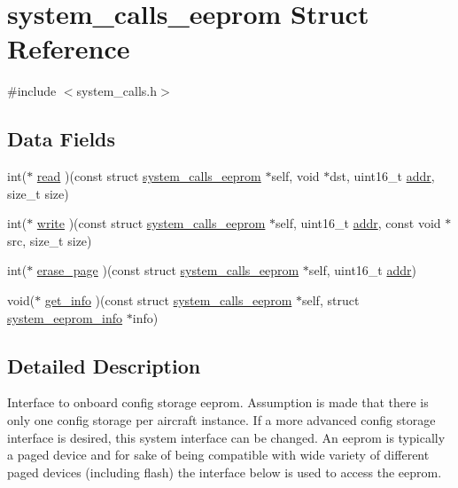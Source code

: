 \hypertarget{structsystem__calls__eeprom}{\section{system\+\_\+calls\+\_\+eeprom Struct Reference}
\label{structsystem__calls__eeprom}
}


{\ttfamily \#include $<$system\+\_\+calls.\+h$>$}

\subsection*{Data Fields}
\begin{DoxyCompactItemize}
\item 
int($\ast$ \hyperlink{structsystem__calls__eeprom_a50c4197d24c30fa3781ec7ec1636c8c6}{read} )(const struct \hyperlink{structsystem__calls__eeprom}{system\+\_\+calls\+\_\+eeprom} $\ast$self, void $\ast$dst, uint16\+\_\+t \hyperlink{config_8c_a41a6aad09727eb120338c35535a652a6}{addr}, size\+\_\+t size)
\item 
int($\ast$ \hyperlink{structsystem__calls__eeprom_a927d9e44a9dd2dcf2d9aa5623954ef07}{write} )(const struct \hyperlink{structsystem__calls__eeprom}{system\+\_\+calls\+\_\+eeprom} $\ast$self, uint16\+\_\+t \hyperlink{config_8c_a41a6aad09727eb120338c35535a652a6}{addr}, const void $\ast$src, size\+\_\+t size)
\item 
int($\ast$ \hyperlink{structsystem__calls__eeprom_acb465a4f40b9f5db82b1afd12a76540f}{erase\+\_\+page} )(const struct \hyperlink{structsystem__calls__eeprom}{system\+\_\+calls\+\_\+eeprom} $\ast$self, uint16\+\_\+t \hyperlink{config_8c_a41a6aad09727eb120338c35535a652a6}{addr})
\item 
void($\ast$ \hyperlink{structsystem__calls__eeprom_a579cab4e2df5260c2f9ef99138e5c195}{get\+\_\+info} )(const struct \hyperlink{structsystem__calls__eeprom}{system\+\_\+calls\+\_\+eeprom} $\ast$self, struct \hyperlink{structsystem__eeprom__info}{system\+\_\+eeprom\+\_\+info} $\ast$info)
\end{DoxyCompactItemize}


\subsection{Detailed Description}
Interface to onboard config storage eeprom. Assumption is made that there is only one config storage per aircraft instance. If a more advanced config storage interface is desired, this system interface can be changed. An eeprom is typically a paged device and for sake of being compatible with wide variety of different paged devices (including flash) the interface below is used to access the eeprom. 

